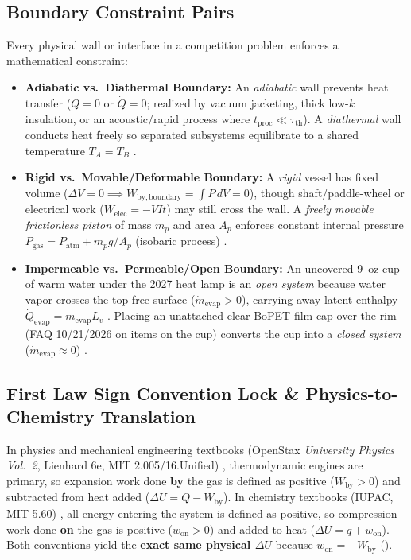 \subsection{Boundary Constraint Pairs}
Every physical wall or interface in a competition problem enforces a mathematical constraint:
\begin{itemize}
  \item \textbf{Adiabatic vs.\ Diathermal Boundary:} An \emph{adiabatic} wall prevents heat transfer ($Q = 0$ or $\dot{Q} = 0$; realized by vacuum jacketing, thick low-$k$ insulation, or an acoustic/rapid process where $t_{\mathrm{proc}} \ll \tau_{\mathrm{th}}$). A \emph{diathermal} wall conducts heat freely so separated subsystems equilibrate to a shared temperature $T_A = T_B$ .
  \item \textbf{Rigid vs.\ Movable/Deformable Boundary:} A \emph{rigid} vessel has fixed volume ($\Delta V = 0 \implies W_{\mathrm{by,boundary}} = \int P\,dV = 0$), though shaft/paddle-wheel or electrical work ($W_{\mathrm{elec}} = -VIt$) may still cross the wall. A \emph{freely movable frictionless piston} of mass $m_p$ and area $A_p$ enforces constant internal pressure $P_{\mathrm{gas}} = P_{\mathrm{atm}} + m_p g / A_p$ (isobaric process) .
  \item \textbf{Impermeable vs.\ Permeable/Open Boundary:} An uncovered 9~oz cup of warm water under the 2027 heat lamp is an \emph{open system} because water vapor crosses the top free surface ($\dot{m}_{\mathrm{evap}} > 0$), carrying away latent enthalpy $\dot{Q}_{\mathrm{evap}} = \dot{m}_{\mathrm{evap}} L_v$ . Placing an unattached clear BoPET film cap over the rim (FAQ 10/21/2026 on items on the cup) converts the cup into a \emph{closed system} ($\dot{m}_{\mathrm{evap}} \approx 0$) .
\end{itemize}

\subsection{First Law Sign Convention Lock \& Physics-to-Chemistry Translation}

In physics and mechanical engineering textbooks (OpenStax \emph{University Physics Vol.~2}, Lienhard 6e, MIT 2.005/16.Unified) , thermodynamic engines are primary, so expansion work done \textbf{by} the gas is defined as positive ($W_{\mathrm{by}} > 0$) and subtracted from heat added ($\Delta U = Q - W_{\mathrm{by}}$). In chemistry textbooks (IUPAC, MIT 5.60) , all energy entering the system is defined as positive, so compression work done \textbf{on} the gas is positive ($w_{\mathrm{on}} > 0$) and added to heat ($\Delta U = q + w_{\mathrm{on}}$). Both conventions yield the \textbf{exact same physical $\Delta U$} because $w_{\mathrm{on}} = -W_{\mathrm{by}}$ ().

